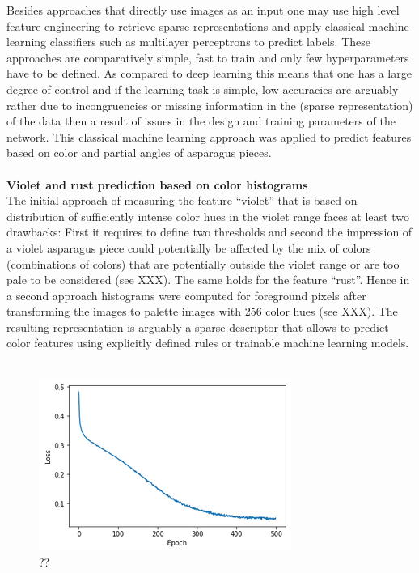 Besides approaches that directly use images as an input one may use high level feature engineering to retrieve sparse representations and apply classical machine learning classifiers such as multilayer perceptrons to predict labels. These approaches are comparatively simple, fast to train and only few hyperparameters have to be defined. As compared to deep learning this means that one has a large degree of control and if the learning task is simple, low accuracies are arguably rather due to incongruencies or missing information in the (sparse representation) of the data then a result of issues in the design and training parameters of the network. This classical machine learning approach was applied to predict features based on color and partial angles of asparagus pieces.\\
\\
\textbf{Violet and rust prediction based on color histograms} \\
The initial approach of measuring the feature “violet” that is based on distribution of sufficiently intense color hues in the violet range faces at least two drawbacks: First it requires to define two thresholds and second the impression of a violet asparagus piece could potentially be affected by the mix of colors (combinations of colors) that are potentially outside the violet range or are too pale to be considered (see XXX). The same holds for the feature “rust”. Hence in a second approach histograms were computed for foreground pixels after transforming the images to palette images with 256 color hues (see XXX). The resulting representation is arguably a sparse descriptor that allows to predict color features using explicitly defined rules or trainable machine learning models. \\
\\
\begin{figure}[h]
	\centering
	\includegraphics[scale=0.6]{Figures/chapter04/feature_engineering}
	\decoRule
	\caption[??]{??}
	\label{fig:FeatureEngineering}
\end{figure}

